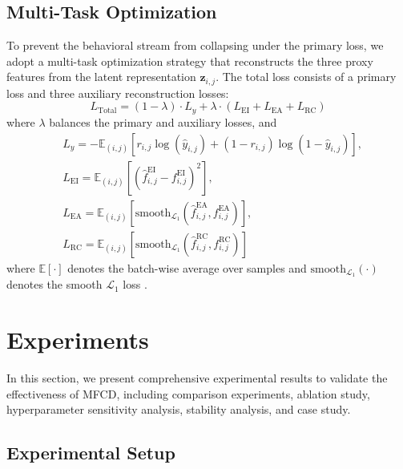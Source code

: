 \documentclass[a4paper,runningheads]{llncs}
\def\mymethod{MFCD}
\begin{document}
\subsection{Multi-Task Optimization}
To prevent the behavioral stream from collapsing under the primary loss, we adopt a multi-task optimization strategy that reconstructs the three proxy features from the latent representation $\bm{z}_{i,j}$. The total loss consists of a primary loss and three auxiliary reconstruction losses:
\begin{equation}
    L_{\text{Total}} = (1-\lambda)\cdot L_y + \lambda\cdot\left(L_{\text{EI}} + L_{\text{EA}} + L_{\text{RC}}\right)
\end{equation}
where $\lambda$ balances the primary and auxiliary losses, and
\begin{align}
&L_y = -\mathbb{E}_{(i,j)} \left[ r_{i,j} \log(\hat{y}_{i,j}) + (1-r_{i,j})\log(1-\hat{y}_{i,j}) \right],\\
&L_{\text{EI}} = \mathbb{E}_{(i,j)} \left[\left( \hat{f}_{i,j}^{\text{EI}} - f_{i,j}^{\text{EI}} \right)^2\right],\\
&L_{\text{EA}} = \mathbb{E}_{(i,j)} \left[\text{smooth}_{\mathcal{L}_1}\left( \hat{f}_{i,j}^{\text{EA}}, f_{i,j}^{\text{EA}} \right)\right],\\
&L_{\text{RC}} = \mathbb{E}_{(i,j)} \left[\text{smooth}_{\mathcal{L}_1}\left( \hat{f}_{i,j}^{\text{RC}}, f_{i,j}^{\text{RC}} \right)\right]
\end{align}
where $\mathbb{E}[\cdot]$ denotes the batch-wise average over samples and $\text{smooth}_{\mathcal{L}_1}(\cdot)$ denotes the smooth $\mathcal{L}_1$ loss \cite{girshick2015fast}.



\section{Experiments}

In this section, we present comprehensive experimental results to validate the effectiveness of \mymethod, including comparison experiments, ablation study, hyperparameter sensitivity analysis, stability analysis, and case study.

\subsection{Experimental Setup}
\end{document}
